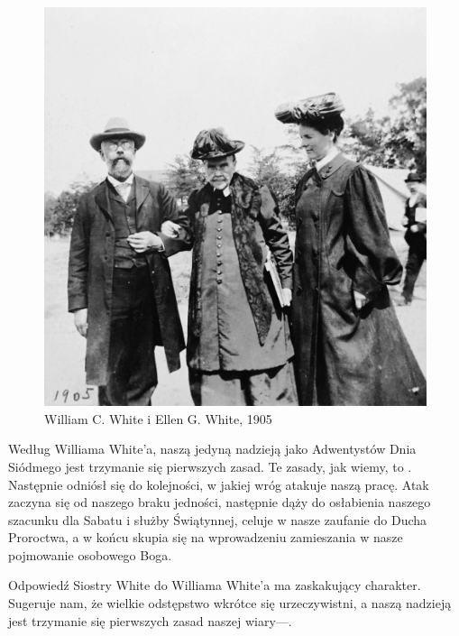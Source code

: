\begin{figure}
    \centering
    \includegraphics[width=1\linewidth]{images/william-ellen-white-1905.jpg}
    \caption*{William C. White i Ellen G. White, 1905}
    \label{fig:w-e-white}
\end{figure}

Według Williama White'a, naszą jedyną nadzieją jako Adwentystów Dnia Siódmego jest trzymanie się pierwszych zasad. Te zasady, jak wiemy, to . Następnie odniósł się do kolejności, w jakiej wróg atakuje naszą pracę. Atak zaczyna się od naszego braku jedności, następnie dąży do osłabienia naszego szacunku dla Sabatu i służby Świątynnej, celuje w nasze zaufanie do Ducha Proroctwa, a w końcu skupia się na wprowadzeniu zamieszania w nasze pojmowanie osobowego Boga.

Odpowiedź Siostry White do Williama White'a ma zaskakujący charakter. Sugeruje nam, że wielkie odstępstwo wkrótce się urzeczywistni, a naszą nadzieją jest trzymanie się pierwszych zasad naszej wiary—.

 \\
 \\
 \\


